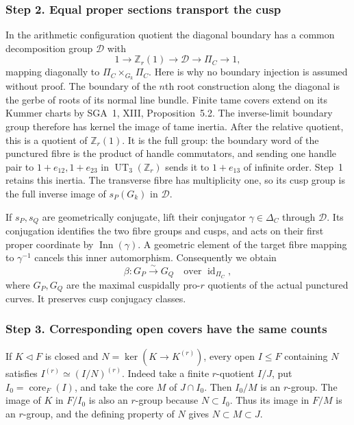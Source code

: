 \subsubsection*{Step 2. Equal proper sections transport the cusp}
In the arithmetic configuration quotient the diagonal boundary has
a common decomposition group $\mathcal D$ with
\[
 1\to\mathbb Z_r(1)\to\mathcal D\to\Pi_C\to1,
 \tag{A05.2}
\]
mapping diagonally to $\Pi_C\times_{G_k}\Pi_C$. Here is why no
boundary injection is assumed without proof. The boundary of the
$n$th root construction along the diagonal is the gerbe of roots
of its normal line bundle. Finite tame covers extend on its
Kummer charts by SGA~1, XIII, Proposition~5.2. The inverse-limit
boundary group therefore has kernel the image of tame inertia.
After the relative quotient, this is a quotient of $\mathbb Z_r(1)$.
It is the full group: the boundary word of the punctured fibre is
the product of handle commutators, and sending one handle pair
to $1+e_{12},1+e_{23}$ in $\operatorname{UT}_3(\mathbb Z_r)$
sends it to $1+e_{13}$ of infinite order. Step~1 retains this
inertia. The transverse fibre has multiplicity one, so its cusp
group is the full inverse image of $s_P(G_k)$ in $\mathcal D$.

If $s_P,s_Q$ are geometrically conjugate, lift their conjugator
$\gamma\in\Delta_C$ through $\mathcal D$. Its conjugation
identifies the two fibre groups and cusps, and acts on their first
proper coordinate by $\operatorname{Inn}(\gamma)$. A geometric
element of the target fibre mapping to $\gamma^{-1}$ cancels this
inner automorphism. Consequently we obtain
\[
 \beta:G_P\xrightarrow\sim G_Q
 \quad\text{over }\operatorname{id}_{\Pi_C},
 \tag{A05.3}
\]
where $G_P,G_Q$ are the maximal cuspidally pro-$r$ quotients of
the actual punctured curves. It preserves cusp conjugacy classes.

\subsubsection*{Step 3. Corresponding open covers have the same counts}
If $K\triangleleft F$ is closed and
$N=\ker(K\to K^{(r)})$, every open $I\le F$ containing $N$
satisfies $I^{(r)}\simeq(I/N)^{(r)}$. Indeed take a finite
$r$-quotient $I/J$, put $I_0=\operatorname{core}_F(I)$, and take
the core $M$ of $J\cap I_0$. Then $I_0/M$ is an $r$-group.
The image of $K$ in $F/I_0$ is also an $r$-group because
$N\subset I_0$. Thus its image in $F/M$ is an $r$-group, and
the defining property of $N$ gives $N\subset M\subset J$.

